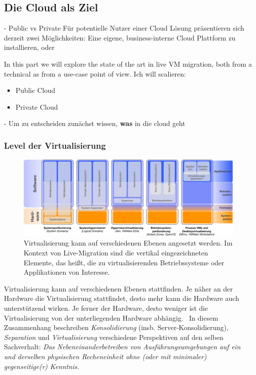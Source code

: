 \subsection{Die Cloud als Ziel}
\label{sec:sota}
- Public vs Private
Für potentielle Nutzer einer Cloud Lösung präsentieren sich derzeit
zwei Möglichkeiten: Eine eigene, business-interne Cloud Plattform zu
installieren, oder 

In this part we will explore the state of the art in live VM
migration, both from a technical as from a use-case point of view.
Ich will scalieren:
\begin{itemize}
\item Public Cloud
\item Private Cloud
\end{itemize}
- Um zu entscheiden zunächst wissen, {\bf was} in die cloud geht

\subsubsection{Level der Virtualisierung}
\label{sec:def-virtualisierung}

\begin{figure}[htbp]
  \centering
  \includegraphics[width=\textwidth]{images/Virtualisierungslevel}
  \caption{Virtualisierung kann auf verschiedenen Ebenen angesetzt werden. Im Kontext von Live-Migration sind die vertikal eingezeichneten Elemente, das heißt, die zu virtualisierenden Betriebssysteme oder Applikationen von Interesse. }
  \label{fig:levels}
\end{figure}

Virtualisierung kann auf verschiedenen Ebenen stattfinden. Je näher an
der Hardware die Virtualisierung stattfindet, desto mehr kann die
Hardware auch unterstützend wirken. Je ferner der Hardware, desto
weniger ist die Virtualisierung von der unterliegenden Hardware
abhängig.~\cite{Giesekus2010:Virtualisierung} In diesem Zusammenhang
beschreiben \emph{Konsolidierung} (insb. Server-Konsolidierung),
\emph{Separation} und \emph{Virtualisierung} verschiedene Perspektiven
auf den selben Sachverhalt: \emph{Das Nebeneinanderbetreiben von
Ausführungsumgebungen auf ein und derselben physischen Recheneinheit
ohne (oder mit minimaler) gegenseitige(r) Kenntnis.}

